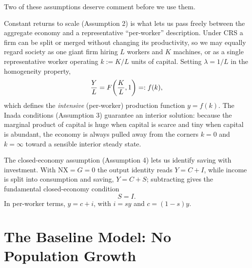 Two of these assumptions deserve comment before we use them.

Constant returns to scale (Assumption 2) is what lets us pass freely between the aggregate economy and a representative ``per-worker'' description. Under CRS a firm can be split or merged without changing its productivity, so we may equally regard society as one giant firm hiring $L$ workers and $K$ machines, or as a single representative worker operating $k := K/L$ units of capital. Setting $\lambda = 1/L$ in the homogeneity property,
\[
\frac{Y}{L} = F\!\left(\frac{K}{L}, 1\right) =: f(k),
\]
which defines the \emph{intensive} (per-worker) production function $y = f(k)$. The Inada conditions (Assumption 3) guarantee an interior solution: because the marginal product of capital is huge when capital is scarce and tiny when capital is abundant, the economy is always pulled away from the corners $k = 0$ and $k = \infty$ toward a sensible interior steady state.

The closed-economy assumption (Assumption 4) lets us identify saving with investment. With $\mathrm{NX} = G = 0$ the output identity reads $Y = C + I$, while income is split into consumption and saving, $Y = C + S$; subtracting gives the fundamental closed-economy condition
\[
S = I.
\]
In per-worker terms, $y = c + i$, with $i = sy$ and $c = (1-s)y$.


\section{The Baseline Model: No Population Growth}

